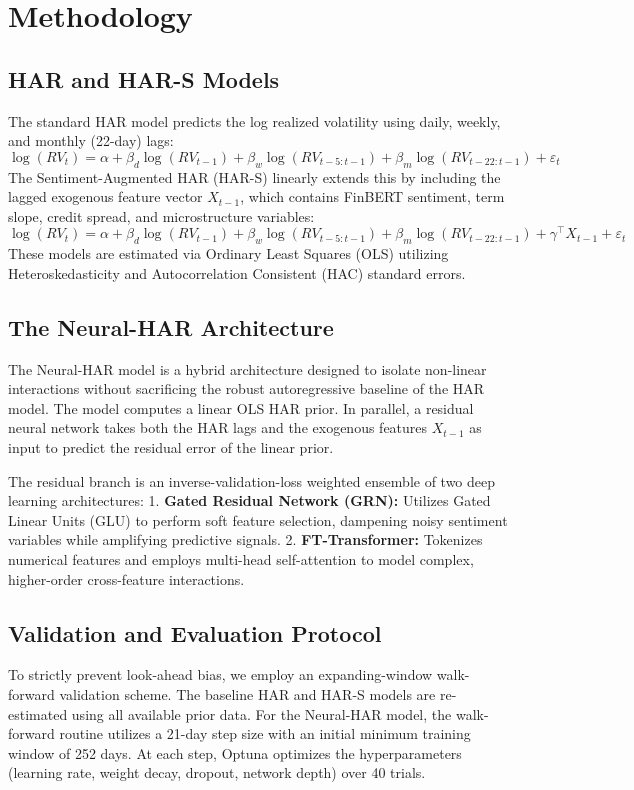 \section{Methodology}
\label{sec:methodology}

\subsection{HAR and HAR-S Models}
The standard HAR model predicts the log realized volatility using daily, weekly, and monthly (22-day) lags:
\begin{equation}
\log(RV_t) = \alpha + \beta_d \log(RV_{t-1}) + \beta_w \log(RV_{t-5:t-1}) + \beta_m \log(RV_{t-22:t-1}) + \varepsilon_t
\end{equation}
The Sentiment-Augmented HAR (HAR-S) linearly extends this by including the lagged exogenous feature vector $X_{t-1}$, which contains FinBERT sentiment, term slope, credit spread, and microstructure variables:
\begin{equation}
\log(RV_t) = \alpha + \beta_d \log(RV_{t-1}) + \beta_w \log(RV_{t-5:t-1}) + \beta_m \log(RV_{t-22:t-1}) + \gamma^\top X_{t-1} + \varepsilon_t
\end{equation}
These models are estimated via Ordinary Least Squares (OLS) utilizing Heteroskedasticity and Autocorrelation Consistent (HAC) standard errors.

\subsection{The Neural-HAR Architecture}
The Neural-HAR model is a hybrid architecture designed to isolate non-linear interactions without sacrificing the robust autoregressive baseline of the HAR model. The model computes a linear OLS HAR prior. In parallel, a residual neural network takes both the HAR lags and the exogenous features $X_{t-1}$ as input to predict the residual error of the linear prior.

The residual branch is an inverse-validation-loss weighted ensemble of two deep learning architectures:
1. \textbf{Gated Residual Network (GRN):} Utilizes Gated Linear Units (GLU) to perform soft feature selection, dampening noisy sentiment variables while amplifying predictive signals.
2. \textbf{FT-Transformer:} Tokenizes numerical features and employs multi-head self-attention to model complex, higher-order cross-feature interactions.

\subsection{Validation and Evaluation Protocol}
To strictly prevent look-ahead bias, we employ an expanding-window walk-forward validation scheme. The baseline HAR and HAR-S models are re-estimated using all available prior data. For the Neural-HAR model, the walk-forward routine utilizes a 21-day step size with an initial minimum training window of 252 days. At each step, Optuna optimizes the hyperparameters (learning rate, weight decay, dropout, network depth) over 40 trials.

